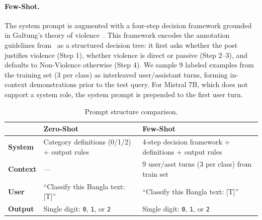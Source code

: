 \documentclass[sigconf,nonacm]{acmart}
\begin{document}
\paragraph{Few-Shot.}
The system prompt is augmented with a four-step decision framework grounded in Galtung's theory of violence~\cite{galtung}. This framework encodes the annotation guidelines from~\cite{violens} as a structured decision tree: it first asks whether the post justifies violence (Step 1), whether violence is direct or passive (Step 2--3), and defaults to Non-Violence otherwise (Step 4). We sample 9 labeled examples from the training set (3 per class) as interleaved user/assistant turns, forming in-context demonstrations prior to the test query. For Mistral 7B, which does not support a system role, the system prompt is prepended to the first user turn.

\begin{table}[t]
\caption{Prompt structure comparison.}
\label{tab:prompts}
\small
\setlength{\tabcolsep}{4pt}
\begin{tabularx}{\columnwidth}{@{}lXX@{}}
\toprule
 & \textbf{Zero-Shot} & \textbf{Few-Shot} \\
\midrule
\textbf{System} & Category definitions (0/1/2) + output rules & 4-step decision framework + definitions + output rules \\
\midrule
\textbf{Context} & — & 9 user/asst turns (3 per class) from train set \\
\midrule
\textbf{User} & ``Classify this Bangla text: [T]'' & ``Classify this Bangla text: [T]'' \\
\midrule
\textbf{Output} & Single digit: \texttt{0}, \texttt{1}, or \texttt{2} & Single digit: \texttt{0}, \texttt{1}, or \texttt{2} \\
\bottomrule
\end{tabularx}
\end{table}
\end{document}
